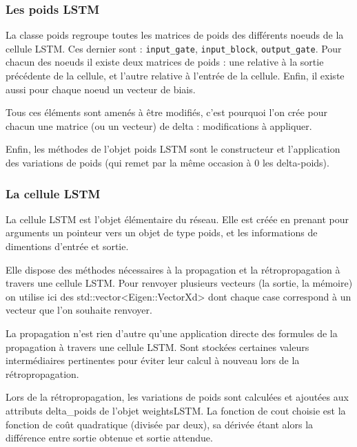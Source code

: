 \subsubsection{Les poids LSTM}

La classe poids regroupe toutes les matrices de poids des différents noeuds
de la cellule LSTM. Ces dernier sont : \verb+input_gate+, \verb+input_block+,
\verb+output_gate+. Pour chacun des noeuds il existe deux matrices de poids :
une relative à la sortie précédente de la cellule, et l'autre relative à
l'entrée de la cellule. Enfin, il existe aussi pour chaque noeud un vecteur
de biais.

\medskip

Tous ces éléments sont amenés à être modifiés, c'est pourquoi l'on crée pour
chacun une matrice (ou un vecteur) de delta : modifications à appliquer.

\medskip

Enfin, les méthodes de l'objet poids LSTM sont le constructeur et
l'application des variations de poids (qui remet par la même occasion à 0
les delta-poids).

\subsubsection{La cellule LSTM}

La cellule LSTM est l'objet élémentaire du réseau. Elle est créée en prenant
pour arguments un pointeur vers un objet de type poids, et les informations de
dimentions d'entrée et sortie.

\medskip

Elle dispose des méthodes nécessaires à la propagation et la rétropropagation
à travers une cellule LSTM.
Pour renvoyer plusieurs vecteurs (la sortie, la mémoire) on utilise ici des
std::vector<Eigen::VectorXd> dont chaque case correspond à un vecteur que l'on
souhaite renvoyer.

\medskip

La propagation n'est rien d'autre qu'une application directe des formules de la
propagation à travers une cellule LSTM. Sont stockées certaines valeurs
intermédiaires pertinentes pour éviter leur calcul à nouveau lors de la
rétropropagation.

\medskip

Lors de la rétropropagation, les variations de poids sont calculées et ajoutées
aux attributs delta\_poids de l'objet weightsLSTM. La fonction de cout choisie
est la fonction de coût quadratique (divisée par deux), sa dérivée étant alors
la différence entre sortie obtenue et sortie attendue.

